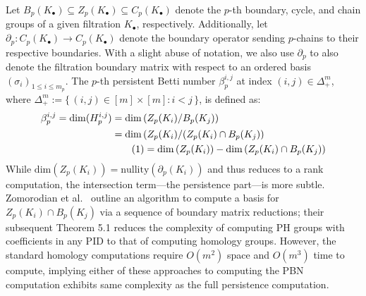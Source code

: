 \documentclass[10pt]{article}
\numberwithin{equation}{section}
\newcommand{\+}{%
	\raisebox{0.18ex}{\scaleobj{0.55}{+}}
}
\theoremstyle{definition}
\newcommand\numberthis{\addtocounter{equation}{1}\tag{\theequation}}
\begin{document}
Let $B_p(K_\bullet) \subseteq Z_p(K_\bullet) \subseteq C_p(K_\bullet)$ denote the $p$-th boundary, cycle, and chain groups of a given filtration $K_\bullet$, respectively. 
Additionally, let $\partial_p : C_p( K_{\bullet}) \to C_p(K_{\bullet})$ denote the boundary operator sending $p$-chains to their respective boundaries. 
With a slight abuse of notation, we also use $\partial_p$ to also denote the filtration boundary matrix with respect to an ordered basis $(\sigma_i)_{1 \leq i \leq m_p}$.
The $p$-th persistent Betti number $\beta_p^{i,j}$ at index $(i,j) \in \Delta_+^m$, where $\Delta_+^m  := \{ \, (i,j) \in [m] \times [m] : i < j \, \}$, is defined as: 
\begin{align*} \label{eq:pbn}
	\centering
	\beta_p^{i,j} = \mathrm{dim}(H_p^{i,j}) &= \mathrm{dim} \left ( Z_p(K_i) / B_p(K_j) \right ) \\
	& = \mathrm{dim} \left( Z_p(K_i) / (Z_p(K_i) \cap B_p(K_j) \right) \\
	& \numberthis = \mathrm{dim} \left( Z_p(K_i) \right) - \mathrm{dim}\left( Z_p(K_i) \cap B_p(K_j) \right ) 
\end{align*}
While $\mathrm{dim}(Z_p(K_i)) = \mathrm{nullity}(\partial_p(K_i))$ and thus reduces to a rank computation, the intersection term---the persistence part---is more subtle. Zomorodian et al.~\cite{zomorodian2004computing} outline an algorithm to compute a basis for $Z_p(K_i) \cap B_p(K_j)$ via a sequence of boundary matrix reductions; their subsequent Theorem 5.1 reduces the complexity of computing PH groups with coefficients in any PID to that of computing homology groups. 
However, the standard homology computations require $O(m^2)$ space and $O(m^3)$ time to compute, implying either of these approaches to computing the PBN computation exhibits same complexity as the full persistence computation.


\end{document}
